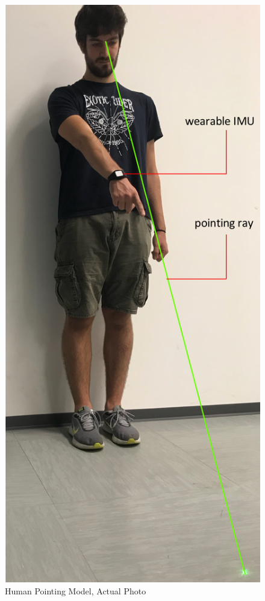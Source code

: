 \begin{figure}
	\centering
	\includegraphics[width=.5\textwidth]{img/pointingCap.png}%
	\caption{Human Pointing Model, Actual Photo}
	\label{fig:pointingCap}
\end{figure}

